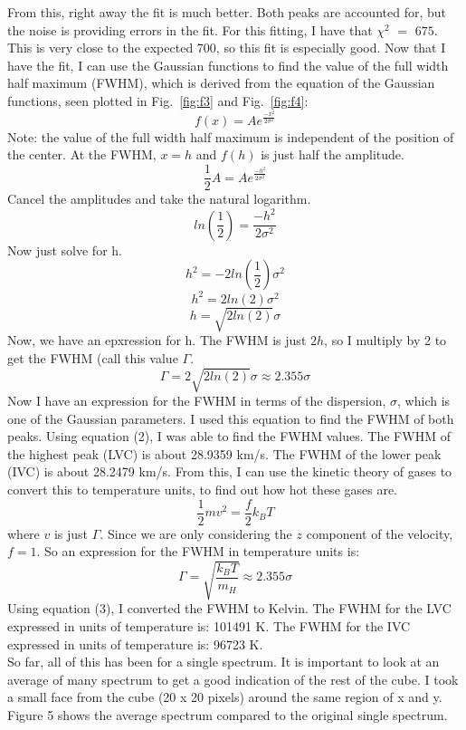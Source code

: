 \documentclass[12pt]{report}
\begin{document}
From this, right away the fit is much better. Both peaks are accounted for, but the noise is providing errors in the fit.
For this fitting, I have that $\chi^{2}$ $=$ $675$.
This is very close to the expected 700, so this fit is especially good.
Now that I have the fit, I can use the Gaussian functions to find the value of the full width half maximum (FWHM), which is derived from the equation of the Gaussian functions, seen plotted in Fig.~\ref{fig:f3} and Fig.~\ref{fig:f4}:
$$ f(x) = Ae^{\frac{-x^{2}}{2\sigma^{2}}} $$
Note: the value of the full width half maximum is independent of the position of the center. 
At the FWHM, $x = h$ and $f(h)$ is just half the amplitude.
$$ \frac{1}{2}A = Ae^{\frac{-h^{2}}{2\sigma^{2}}} $$
Cancel the amplitudes and take the natural logarithm.
$$ ln(\frac{1}{2}) = \frac{-h^{2}}{2\sigma^{2}} $$ 
Now just solve for h.
$$ h^{2} = -2ln(\frac{1}{2})\sigma^{2}  $$
$$  h^{2} = 2ln(2)\sigma^{2} $$
$$  h = \sqrt{2ln(2)}\sigma $$
Now, we have an epxression for h. The FWHM is just $2h$, so I multiply by 2 to get the FWHM (call this value $\Gamma$.
\begin{equation}
 \Gamma = 2\sqrt{2ln(2)}\sigma \approx 2.355\sigma
\end{equation}
Now I have an expression for the FWHM in terms of the dispersion, $\sigma$, which is one of the Gaussian parameters.
I used this equation to find the FWHM of both peaks. 
Using equation (2), I was able to find the FWHM values.
The FWHM of the highest peak (LVC) is about 28.9359 km/s.
The FWHM of the lower peak (IVC) is about 28.2479 km/s. From this, I can use the kinetic theory of gases to convert this to temperature units, to find out how hot these gases are.
$$ \frac{1}{2} m v^{2} = \frac{f}{2} k_{B} T $$
where $v$ is just $\Gamma$.
Since we are only considering the $z$ component of the velocity, $f = 1$. 
So an expression for the FWHM in temperature units is:
\begin{equation}
\Gamma = \sqrt{\frac{k_B T}{m_H}} \approx 2.355\sigma
\end{equation}
Using equation (3), I converted the FWHM to Kelvin.
The FWHM for the LVC expressed in units of temperature is: 101491 K.
The FWHM for the IVC expressed in units of temperature is: 96723 K. \\
So far, all of this has been for a single spectrum. 
It is important to look at an average of many spectrum to get a good indication of the rest of the cube. 
I took a small face from the cube (20 x 20 pixels) around the same region of x and y.
Figure 5 shows the average spectrum compared to the original single spectrum.
\end{document}
